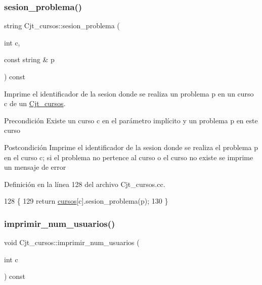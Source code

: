 \subsubsection{\texorpdfstring{sesion\+\_\+problema()}{sesion\_problema()}}
{\footnotesize\ttfamily string Cjt\+\_\+cursos\+::sesion\+\_\+problema (\begin{DoxyParamCaption}\item[{int}]{c,  }\item[{const string \&}]{p }\end{DoxyParamCaption}) const}



Imprime el identificador de la sesion donde se realiza un problema p en un curso c de un \mbox{\hyperlink{class_cjt__cursos}{Cjt\+\_\+cursos}}. 

\begin{DoxyPrecond}{Precondición}
Existe un curso c en el parámetro implícito y un problema p en este curso 
\end{DoxyPrecond}
\begin{DoxyPostcond}{Postcondición}
Imprime el identificador de la sesion donde se realiza el problema p en el curso c; si el problema no pertence al curso o el curso no existe se imprime un mensaje de error 
\end{DoxyPostcond}


Definición en la línea 128 del archivo Cjt\+\_\+cursos.\+cc.


\begin{DoxyCode}
128                                                                    \{
129       \textcolor{keywordflow}{return} \mbox{\hyperlink{class_cjt__cursos_a582f9540bc295212450dba4cd18c8886}{cursos}}[c].sesion\_problema(p);
130     \}
\end{DoxyCode}
\mbox{\label{class_cjt__cursos_a7d5981081ad5aeaa73bdd88b4a7f66c9}} 
\subsubsection{\texorpdfstring{imprimir\+\_\+num\+\_\+usuarios()}{imprimir\_num\_usuarios()}}
{\footnotesize\ttfamily void Cjt\+\_\+cursos\+::imprimir\+\_\+num\+\_\+usuarios (\begin{DoxyParamCaption}\item[{int}]{c }\end{DoxyParamCaption}) const}



